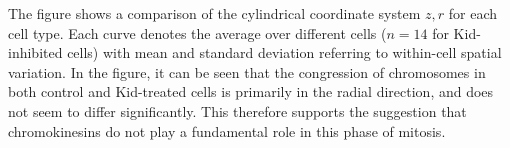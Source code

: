 \documentclass[times, twoside,onecolumn]{zHenriquesLab-StyleBioRxiv}
\begin{document}
The figure shows a comparison of the cylindrical coordinate system $z, r$ for each cell type. Each curve denotes the average over different cells ($n=14$ for Kid-inhibited cells) with mean and standard deviation referring to within-cell spatial variation. In the figure, it can be seen that the congression of chromosomes in both control and Kid-treated cells is primarily in the radial direction, and does not seem to differ significantly. This therefore supports the suggestion that chromokinesins do not play a fundamental role in this phase of mitosis. 






\end{document}
